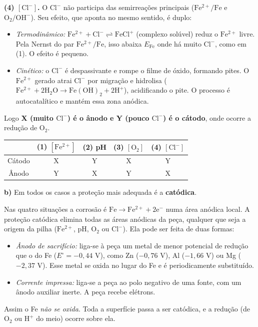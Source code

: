 \documentclass{article}%
\begin{document}
\textbf{(4) $[\mathrm{Cl^-}]$.} O $\mathrm{Cl^-}$ não participa das semirreações principais ($\mathrm{Fe^{2+}/Fe}$ e $\mathrm{O_2/OH^-}$). Seu efeito, que aponta no mesmo sentido, é duplo:
\begin{itemize}
\item \emph{Termodinâmico:} $\mathrm{Fe^{2+}+Cl^-\rightleftharpoons FeCl^+}$ (complexo solúvel) reduz o $\mathrm{Fe^{2+}}$ livre. Pela Nernst do par $\mathrm{Fe^{2+}/Fe}$, isso abaixa $E_{\mathrm{Fe}}$ onde há muito $\mathrm{Cl^-}$, como em (1). O efeito é pequeno.
\item \emph{Cinético:} o $\mathrm{Cl^-}$ é despassivante e rompe o filme de óxido, formando pites. O $\mathrm{Fe^{2+}}$ gerado atrai $\mathrm{Cl^-}$ por migração e hidrolisa ($\mathrm{Fe^{2+}+2H_2O\to Fe(OH)_2+2H^+}$), acidificando o pite. O processo é autocatalítico e mantém essa zona anódica.
\end{itemize}
Logo \textbf{X (muito $\mathrm{Cl^-}$) é o ânodo e Y (pouco $\mathrm{Cl^-}$) é o cátodo}, onde ocorre a redução de $\mathrm{O_2}$.

\begin{center}
\begin{tabular}{c|c|c|c|c}
 & (1) $[\mathrm{Fe^{2+}}]$ & (2) pH & (3) $[\mathrm{O_2}]$ & (4) $[\mathrm{Cl^-}]$\\\hline
Cátodo & X & Y & X & Y\\
Ânodo & Y & X & Y & X
\end{tabular}
\end{center}

\textbf{b)} Em todos os casos a proteção mais adequada é a \textbf{catódica}.

Nas quatro situações a corrosão é $\mathrm{Fe\to Fe^{2+}+2e^-}$ numa área anódica local. A proteção catódica elimina todas as áreas anódicas da peça, qualquer que seja a origem da pilha ($\mathrm{Fe^{2+}}$, pH, $\mathrm{O_2}$ ou $\mathrm{Cl^-}$). Ela pode ser feita de duas formas:
\begin{itemize}
\item \emph{Ânodo de sacrifício:} liga-se à peça um metal de menor potencial de redução que o do Fe ($E^\circ=-0{,}44$ V), como Zn ($-0{,}76$ V), Al ($-1{,}66$ V) ou Mg ($-2{,}37$ V). Esse metal se oxida no lugar do Fe e é periodicamente substituído.
\item \emph{Corrente impressa:} liga-se a peça ao polo negativo de uma fonte, com um ânodo auxiliar inerte. A peça recebe elétrons.
\end{itemize}
Assim o Fe \emph{não se oxida}. Toda a superfície passa a ser catódica, e a redução (de $\mathrm{O_2}$ ou $\mathrm{H^+}$ do meio) ocorre sobre ela.
\end{document}
